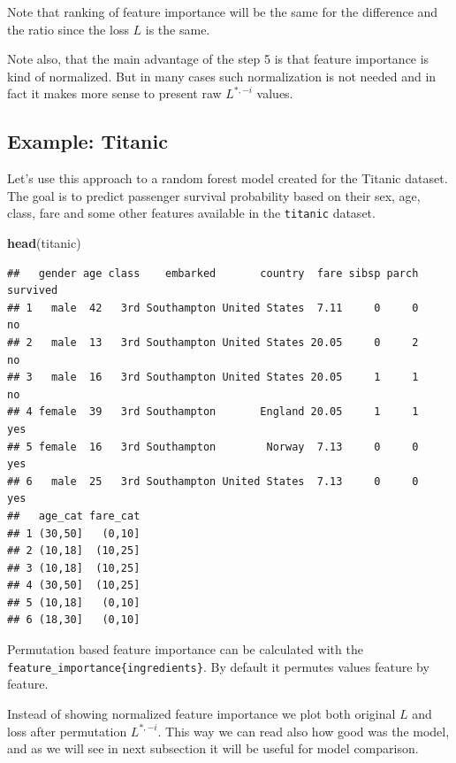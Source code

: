 \documentclass[12pt,]{krantz}
\newenvironment{Shaded}{\begin{snugshade}}{\end{snugshade}}
\newcommand{\KeywordTok}[1]{\textcolor[rgb]{0.13,0.29,0.53}{\textbf{#1}}}
\newcommand{\NormalTok}[1]{#1}
\theoremstyle{definition}
\theoremstyle{definition}
\theoremstyle{definition}
\theoremstyle{remark}
\begin{document}
Note that ranking of feature importance will be the same for the
difference and the ratio since the loss \(L\) is the same.

Note also, that the main advantage of the step 5 is that feature
importance is kind of normalized. But in many cases such normalization
is not needed and in fact it makes more sense to present raw
\(L^{*,-i}\) values.

\hypertarget{example-titanic}{%
\subsection{Example: Titanic}\label{example-titanic}}

Let's use this approach to a random forest model created for the Titanic
dataset. The goal is to predict passenger survival probability based on
their sex, age, class, fare and some other features available in the
\texttt{titanic} dataset.

\begin{Shaded}
\begin{Highlighting}[]
\KeywordTok{head}\NormalTok{(titanic)}
\end{Highlighting}
\end{Shaded}

\begin{verbatim}
##   gender age class    embarked       country  fare sibsp parch survived
## 1   male  42   3rd Southampton United States  7.11     0     0       no
## 2   male  13   3rd Southampton United States 20.05     0     2       no
## 3   male  16   3rd Southampton United States 20.05     1     1       no
## 4 female  39   3rd Southampton       England 20.05     1     1      yes
## 5 female  16   3rd Southampton        Norway  7.13     0     0      yes
## 6   male  25   3rd Southampton United States  7.13     0     0      yes
##   age_cat fare_cat
## 1 (30,50]   (0,10]
## 2 (10,18]  (10,25]
## 3 (10,18]  (10,25]
## 4 (30,50]  (10,25]
## 5 (10,18]   (0,10]
## 6 (18,30]   (0,10]
\end{verbatim}

Permutation based feature importance can be calculated with the
\texttt{feature\_importance\{ingredients\}}. By default it permutes
values feature by feature.

Instead of showing normalized feature importance we plot both original
\(L\) and loss after permutation \(L^{*,-i}\). This way we can read also
how good was the model, and as we will see in next subsection it will be
useful for model comparison.
\end{document}
